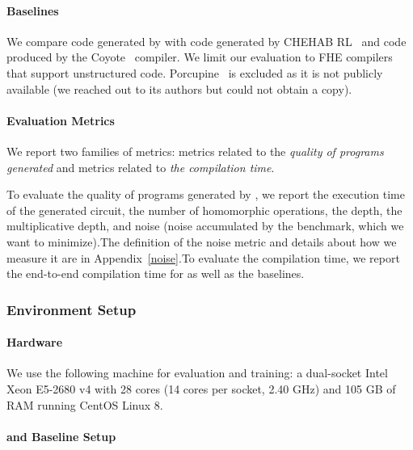 \paragraph{Baselines}

We compare code generated by \ToolName{} with code generated by CHEHAB RL~\cite{ChehabRL} and code produced by the Coyote~\cite{Malik2023Coyote} compiler.
We limit our evaluation to FHE compilers that support unstructured code.
Porcupine~\cite{Cowan2021Porcupine} is excluded as it is not publicly available (we reached out to its authors but could not obtain a copy).


\paragraph{Evaluation Metrics}

We report two families of metrics: metrics related to the \emph{quality of programs generated} and metrics related to \emph{the compilation time}.

To evaluate the quality of programs generated by \ToolName{}, we report the execution time of the generated circuit, the number of homomorphic operations, the depth, the multiplicative depth, and noise (noise accumulated by the benchmark, which we want to minimize).\ifshowextra The definition of the noise metric and details about how we measure it are in Appendix~\ref{noise}.\fi To evaluate the compilation time, we report the end-to-end compilation time for \ToolName{} as well as the baselines.


\shrink[1]
\subsubsection{Environment Setup \label{sec:evaluation:setup:env}}

\paragraph{Hardware}
We use the following machine for evaluation and training: a dual-socket Intel Xeon E5-2680 v4 with 28 cores (14 cores per socket, 2.40 GHz) and 105 GB of RAM running CentOS Linux 8.



\paragraph{\ToolName{} and Baseline Setup}

